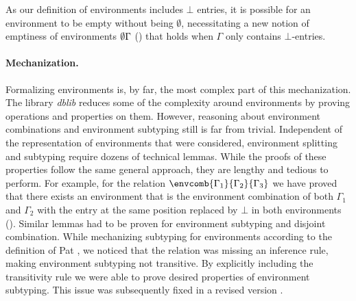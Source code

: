 As our definition of environments includes $\bot$ entries, it is possible for an environment to be empty without being $\emptyset$, necessitating a new notion of emptiness of environments $\emptyset{\Gamma}$ ()
that holds when $\Gamma$ only contains $\bot$-entries.

\paragraph{Mechanization.}
Formalizing environments is, by far, the most complex part of this mechanization.
The library \emph{dblib} reduces some of the complexity around environments by proving operations and properties on them.
However, reasoning about environment combinations and environment subtyping still is far from trivial.
Independent of the representation of environments that were considered, environment splitting and subtyping require dozens of technical lemmas.
While the proofs of these properties follow the same general approach, they are lengthy and tedious to perform.
%
For example, for the relation $\envcomb{\Gamma_1}{\Gamma_2}{\Gamma_3}$ we have proved that
there exists an environment that is the environment combination of both
$\Gamma_1$ and $\Gamma_2$ with the entry at the same position replaced by $\bot$ in both environments ().
Similar lemmas had to be proven for environment subtyping and disjoint combination.
While mechanizing subtyping for environments according to the definition of Pat \cite{fowlerSpecialDeliveryProgramming2023},
we noticed that the relation was missing an inference rule, making environment subtyping not transitive.
By explicitly including the transitivity rule we were able to prove desired properties of environment subtyping.
This issue was subsequently fixed in a revised version \cite{fowlerSpecialDeliveryProgramming2025}.

